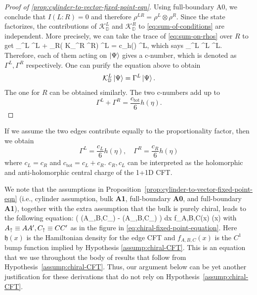 \documentclass[12pt, nofootinbib]{article}
\theoremstyle{plain}
\theoremstyle{assumption}
\theoremstyle{definition}
\theoremstyle{plain}
\theoremstyle{plain}
\theoremstyle{plain}
\theoremstyle{plain}
\theoremstyle{plain}
\newcommand{\calK}{{\mathcal K}}
\def\KD{\calK_{\mathbb{D}}}
\def\veq{\stackrel{\mathbb{V}}{=}}
\def\ctot{c_{\mathrm{tot}}}
\def\({\left(}
\def\){\right)}
\def\hhh{{\mathfrak{h}}}
\begin{document}
\begin{proof}[Proof of \ref{prop:cylinder-to-vector-fixed-point-eqn}]
Using full-boundary A0, we conclude that $I(L:R) = 0 $ and therefore 
$\rho^{LR} = \rho^L \otimes \rho^R$.
Since the state factorizes, the contributions of $\KD^L$ and $\KD^R$ 
to \eqref{eq:sum-of-conditions} are independent.
More precisely, we can take the trace of \eqref{eq:sum-on-rhos} over $R$ to get 
\be   \KD^L  \rho^{L} +  \tr_R( \KD^R \rho^R) \rho^{L} = {\ctot h(\eta) }  \rho^{L},  \ee  
which says 
\be   \KD^L  \rho^{L} \propto  \rho^{L}.  \ee  
Therefore, each of them acting on $\left|\Psi\right\rangle$ gives a c-number, which is denoted as $\Gamma^L,\Gamma^R$ respectively. One can purify the equation above to obtain 
\begin{equation}
    \KD^L \ket{\Psi} = \Gamma^L \ket{\Psi}.
\end{equation}
The one for $R$ can be obtained similarly. 
The two c-numbers add up to 
\begin{equation}
    \Gamma^L +\Gamma^R = \frac{\ctot}{6}h(\eta).
\end{equation}
\end{proof}
If we assume the two edges contribute equally to the proportionality factor, then we obtain 
\begin{equation}
    \Gamma^L = \frac{c_L}{6}h(\eta),\quad \Gamma^R = \frac{c_R}{6}h(\eta)
\end{equation}
where $c_L = c_R$ and $\ctot = c_L + c_R$. $c_R,c_L$ can be interpreted as the holomorphic and anti-holomorphic central charge of the 1+1D CFT. 


We note that the assumptions in Proposition~\ref{prop:cylinder-to-vector-fixed-point-eqn} (i.e., cylinder assumption, bulk \textbf{A1}, full-boundary \textbf{A0}, and full-boundary \textbf{A1}), together with the extra assumption that the bulk is purely chiral, leads to the following equation: 
\be \label{eq:tempabc}
\( \hat \Delta(A_\up,B,C_\up) -  \Delta(A_\up,B,C_\up) \) \ket\Psi 
 \veq \int dx f_{A,B,C}(x)  \hhh(x)\ket\Omega \ee 
with $A_\uparrow \equiv AA', C_\uparrow \equiv CC'$ as in the figure in \eqref{eq:chiral-fixed-point-equation}.
Here $\hhh(x)$ is the Hamiltonian density for the edge CFT and 
$f_{A,B,C}(x)$ is the $C^1$ bump function implied by Hypothesis \ref{assump:chiral-CFT}. This is an equation that we use throughout the body of results that follow from Hypothesis~\ref{assump:chiral-CFT}. Thus, our argument below can be yet another justification for these derivations that do not rely on Hypothesis~\ref{assump:chiral-CFT}.
\end{document}
